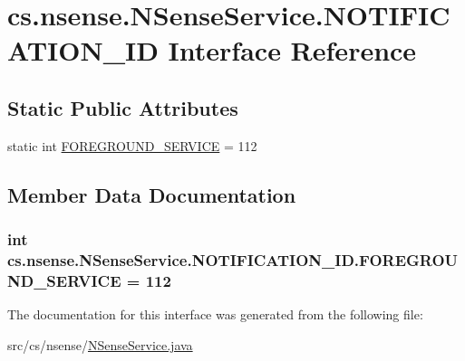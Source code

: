 \hypertarget{interfacecs_1_1nsense_1_1_n_sense_service_1_1_n_o_t_i_f_i_c_a_t_i_o_n___i_d}{\section{cs.\-nsense.\-N\-Sense\-Service.\-N\-O\-T\-I\-F\-I\-C\-A\-T\-I\-O\-N\-\_\-\-I\-D Interface Reference}
\label{interfacecs_1_1nsense_1_1_n_sense_service_1_1_n_o_t_i_f_i_c_a_t_i_o_n___i_d}
}
\subsection*{Static Public Attributes}
\begin{DoxyCompactItemize}
\item 
static int \hyperlink{interfacecs_1_1nsense_1_1_n_sense_service_1_1_n_o_t_i_f_i_c_a_t_i_o_n___i_d_a36130397c1375e2ab6db60533faf28f1}{F\-O\-R\-E\-G\-R\-O\-U\-N\-D\-\_\-\-S\-E\-R\-V\-I\-C\-E} = 112
\end{DoxyCompactItemize}


\subsection{Member Data Documentation}
\hypertarget{interfacecs_1_1nsense_1_1_n_sense_service_1_1_n_o_t_i_f_i_c_a_t_i_o_n___i_d_a36130397c1375e2ab6db60533faf28f1}{
\subsubsection[{F\-O\-R\-E\-G\-R\-O\-U\-N\-D\-\_\-\-S\-E\-R\-V\-I\-C\-E}]{\setlength{\rightskip}{0pt plus 5cm}int cs.\-nsense.\-N\-Sense\-Service.\-N\-O\-T\-I\-F\-I\-C\-A\-T\-I\-O\-N\-\_\-\-I\-D.\-F\-O\-R\-E\-G\-R\-O\-U\-N\-D\-\_\-\-S\-E\-R\-V\-I\-C\-E = 112\hspace{0.3cm}{\ttfamily [static]}}}\label{interfacecs_1_1nsense_1_1_n_sense_service_1_1_n_o_t_i_f_i_c_a_t_i_o_n___i_d_a36130397c1375e2ab6db60533faf28f1}


The documentation for this interface was generated from the following file\-:\begin{DoxyCompactItemize}
\item 
src/cs/nsense/\hyperlink{_n_sense_service_8java}{N\-Sense\-Service.\-java}\end{DoxyCompactItemize}
